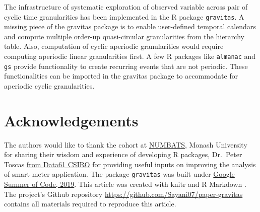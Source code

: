 \documentclass[12pt]{article}
\begin{document}
The infrastructure of systematic exploration of observed variable across pair of cyclic time granularities has been implemented in the
R package \texttt{gravitas}. A missing piece of the gravitas package is to enable user-defined temporal calendars and compute multiple order-up quasi-circular granularities from the hierarchy table. Also, computation of cyclic aperiodic granularities would require computing aperiodic linear granularities first. A few R packages like \texttt{almanac} and \texttt{gs} provide functionality to create recurring events that are not periodic. These functionalities can be imported in the gravitas package to accommodate for aperiodic cyclic granularities.

\hypertarget{acknowledgements}{%
\section*{Acknowledgements}\label{acknowledgements}}

The authors would like to thank the cohort at \href{https://www.monash.edu/news/articles/team-profile-monash-business-analytics-team}{NUMBATS}, Monash University for sharing their wisdom and experience of developing R packages, Dr.~Peter Toscas \href{https://data61.csiro.au/}{from Data61 CSIRO} for providing useful inputs on improving the analysis of smart meter application. The package \texttt{gravitas} was built under \href{https://summerofcode.withgoogle.com/archive/}{Google Summer of Code, 2019}. This article was created with knitr \citep{knitr} and R Markdown \citep{rmarkdown}. The project's Github repository \url{https://github.com/Sayani07/paper-gravitas} contains all materials required to reproduce this article.



\end{document}
